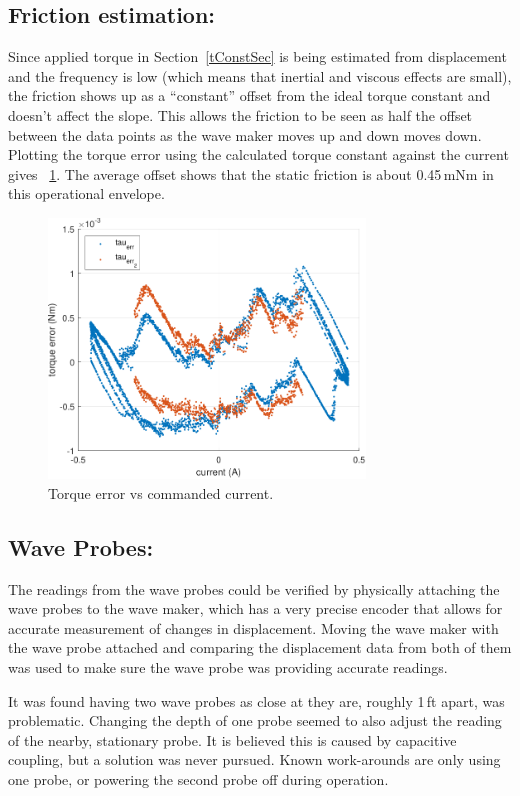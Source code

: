 \documentclass[11pt, letterpaper]{article}
\begin{document}
\subsection{Friction estimation:}\label{friction}
Since applied torque in Section~\ref{tConstSec} is being estimated from displacement and the frequency is low (which means that inertial and viscous effects are small), the friction shows up as a ``constant'' offset from the ideal torque constant and doesn't affect the slope.
This allows the friction to be seen as half the offset between the data points as the wave maker moves up and down moves down. 
Plotting the torque error using the calculated torque constant against the current gives \figurename~\ref{fig:TorqueError}.
The average offset shows that the static friction is about 0.45\,mNm in this operational envelope.

\begin{figure}[tb]
  \centering
  \includegraphics[width=0.75\textwidth]{diagrams/TorqueError.pdf}
  \caption{Torque error vs commanded current.}
  \label{fig:TorqueError}
\end{figure}


\subsection{Wave Probes:}	\label{waveprobes}
The readings from the wave probes could be verified by physically attaching the wave probes to the wave maker, which has a very precise encoder that allows for accurate measurement of changes in displacement.
Moving the wave maker with the wave probe attached and comparing the displacement data from both of them was used to make sure the wave probe was providing accurate readings.

It was found having two wave probes as close at they are, roughly 1\,ft apart, was problematic.
Changing the depth of one probe seemed to also adjust the reading of the nearby, stationary probe.
It is believed this is caused by capacitive coupling, but a solution was never pursued.
Known work-arounds are only using one probe, or powering the second probe off during operation.
\end{document}
